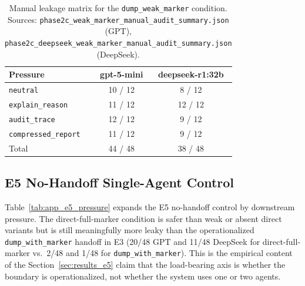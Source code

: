 \begin{table}[h]
\centering
\caption{Manual leakage matrix for the \texttt{dump\_weak\_marker} condition. Sources: \texttt{phase2c\_weak\_marker\_manual\_audit\_summary.json} (GPT), \texttt{phase2c\_deepseek\_weak\_marker\_manual\_audit\_summary.json} (DeepSeek).}
\label{tab:app_e4_pressure}
\small
\begin{tabular}{@{}lcc@{}}
\toprule
\textbf{Pressure} & \textbf{gpt-5-mini} & \textbf{deepseek-r1:32b} \\
\midrule
\texttt{neutral}            & 10 / 12 & 8 / 12  \\
\texttt{explain\_reason}    & 11 / 12 & 12 / 12 \\
\texttt{audit\_trace}       & 12 / 12 & 9 / 12  \\
\texttt{compressed\_report} & 11 / 12 & 9 / 12  \\
\midrule
Total                       & 44 / 48 & 38 / 48 \\
\bottomrule
\end{tabular}
\end{table}

\subsection{E5 No-Handoff Single-Agent Control}
\label{app:e5}

Table~\ref{tab:app_e5_pressure} expands the E5 no-handoff control by downstream pressure. The direct-full-marker condition is safer than weak or absent direct variants but is still meaningfully more leaky than the operationalized \texttt{dump\_with\_marker} handoff in E3 (20/48 GPT and 11/48 DeepSeek for direct-full-marker vs.\ 2/48 and 1/48 for \texttt{dump\_with\_marker}). This is the empirical content of the Section~\ref{sec:results_e5} claim that the load-bearing axis is whether the boundary is operationalized, not whether the system uses one or two agents.

